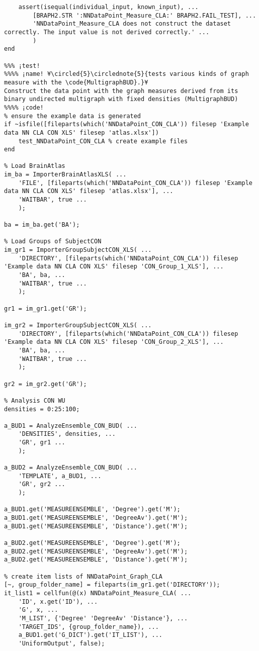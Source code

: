 \documentclass{tufte-handout}
\begin{document}
\begin{lstlisting}
    assert(isequal(individual_input, known_input), ...
        [BRAPH2.STR ':NNDataPoint_Measure_CLA:' BRAPH2.FAIL_TEST], ...
        'NNDataPoint_Measure_CLA does not construct the dataset correctly. The input value is not derived correctly.' ...
        )
end

%%% ¡test!
%%%% ¡name! ¥\circled{5}\circlednote{5}{tests various kinds of graph measure with the \code{MultigraphBUD}.}¥
Construct the data point with the graph measures derived from its binary undirected multigraph with fixed densities (MultigraphBUD)
%%%% ¡code!
% ensure the example data is generated
if ~isfile([fileparts(which('NNDataPoint_CON_CLA')) filesep 'Example data NN CLA CON XLS' filesep 'atlas.xlsx'])
    test_NNDataPoint_CON_CLA % create example files
end

% Load BrainAtlas
im_ba = ImporterBrainAtlasXLS( ...
    'FILE', [fileparts(which('NNDataPoint_CON_CLA')) filesep 'Example data NN CLA CON XLS' filesep 'atlas.xlsx'], ...
    'WAITBAR', true ...
    );

ba = im_ba.get('BA');

% Load Groups of SubjectCON
im_gr1 = ImporterGroupSubjectCON_XLS( ...
    'DIRECTORY', [fileparts(which('NNDataPoint_CON_CLA')) filesep 'Example data NN CLA CON XLS' filesep 'CON_Group_1_XLS'], ...
    'BA', ba, ...
    'WAITBAR', true ...
    );

gr1 = im_gr1.get('GR');

im_gr2 = ImporterGroupSubjectCON_XLS( ...
    'DIRECTORY', [fileparts(which('NNDataPoint_CON_CLA')) filesep 'Example data NN CLA CON XLS' filesep 'CON_Group_2_XLS'], ...
    'BA', ba, ...
    'WAITBAR', true ...
    );

gr2 = im_gr2.get('GR');

% Analysis CON WU
densities = 0:25:100;

a_BUD1 = AnalyzeEnsemble_CON_BUD( ...
    'DENSITIES', densities, ...
    'GR', gr1 ...
    );

a_BUD2 = AnalyzeEnsemble_CON_BUD( ...
    'TEMPLATE', a_BUD1, ...
    'GR', gr2 ...
    );

a_BUD1.get('MEASUREENSEMBLE', 'Degree').get('M');
a_BUD1.get('MEASUREENSEMBLE', 'DegreeAv').get('M');
a_BUD1.get('MEASUREENSEMBLE', 'Distance').get('M');

a_BUD2.get('MEASUREENSEMBLE', 'Degree').get('M');
a_BUD2.get('MEASUREENSEMBLE', 'DegreeAv').get('M');
a_BUD2.get('MEASUREENSEMBLE', 'Distance').get('M');

% create item lists of NNDataPoint_Graph_CLA
[~, group_folder_name] = fileparts(im_gr1.get('DIRECTORY'));
it_list1 = cellfun(@(x) NNDataPoint_Measure_CLA( ...
    'ID', x.get('ID'), ...
    'G', x, ...
    'M_LIST', {'Degree' 'DegreeAv' 'Distance'}, ...
    'TARGET_IDS', {group_folder_name}), ...
    a_BUD1.get('G_DICT').get('IT_LIST'), ...
    'UniformOutput', false);


\end{lstlisting}
\end{document}
